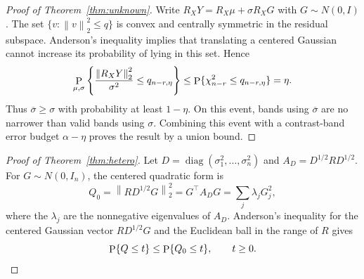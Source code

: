 \documentclass{interact}
\theoremstyle{definition}
\theoremstyle{remark}
\newcommand{\Ph}{\mathop{\rm P}}
\newcommand{\norm}[1]{\left\lVert #1\right\rVert_2}
\begin{document}
\begin{proof}[Proof of Theorem~\ref{thm:unknown}]
Write $R_XY=R_X\mu+\sigma R_XG$ with $G\sim N(0,I)$.  The set
$\{v:\norm v^2\leq q\}$ is convex and centrally symmetric in the residual
subspace.  Anderson's inequality implies that translating a centered Gaussian
cannot increase its probability of lying in this set.  Hence
\[
 \Ph_{\mu,\sigma}\left\{\frac{\norm{R_XY}^2}{\sigma^2}
 \leq q_{n-r,\eta}\right\}
 \leq \Ph\{\chi^2_{n-r}\leq q_{n-r,\eta}\}=\eta.
\]
Thus $\overline\sigma\geq\sigma$ with probability at least $1-\eta$.
On this event, bands using $\overline\sigma$ are no narrower than valid bands
using $\sigma$.  Combining this event with a contrast-band error budget
$\alpha-\eta$ proves the result by a union bound.
\end{proof}

\begin{proof}[Proof of Theorem~\ref{thm:hetero}]
Let $D=\operatorname{diag}(\sigma_1^2,\ldots,\sigma_n^2)$ and
$A_D=D^{1/2}RD^{1/2}$.  For $G\sim N(0,I_n)$, the centered quadratic form is
\[
 Q_0=\norm{RD^{1/2}G}^2=G^\top A_DG
     =\sum_j\lambda_jG_j^2,
\]
where the $\lambda_j$ are the nonnegative eigenvalues of $A_D$.  Anderson's
inequality for the centered Gaussian vector $RD^{1/2}G$ and the Euclidean ball
in the range of $R$ gives
\begin{equation}
 \Ph\{Q\leq t\}\leq\Ph\{Q_0\leq t\},\qquad t\geq0.
\label{eq:anderson-hetero}
\end{equation}


\end{proof}
\end{document}
